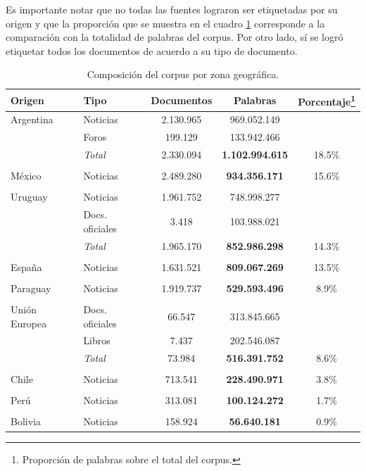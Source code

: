 Es importante notar que no todas las fuentes lograron ser etiquetadas por su origen y que la
proporción que se muestra en el cuadro \ref{table:corpus_country} corresponde a la comparación
con la totalidad de palabras del corpus. Por otro lado, sí se logró etiquetar todos los documentos
de acuerdo a su tipo de documento.

\begin{table}[h]
    \centering
    \begin{tabular}{llccc}
        \hline
        Origen & Tipo & Documentos & Palabras & Porcentaje\footnote{Proporción de palabras sobre el total del corpus.}\\
        \hline
        Argentina
         & Noticias & 2.130.965 & 969.052.149\\
         & Foros & 199.129 & 133.942.466\\
         & \textit{Total} & 2.330.094 & \textbf{1.102.994.615} & 18.5\%\\
        \\
        México
         & Noticias & 2.489.280 & \textbf{934.356.171} & 15.6\%\\
        \\
        Uruguay
         & Noticias & 1.961.752 & 748.998.277\\
         & Docs. oficiales & 3.418 & 103.988.021\\
         & \textit{Total} & 1.965.170 & \textbf{852.986.298} & 14.3\%\\
        \\
        España
         & Noticias & 1.631.521 & \textbf{809.067.269} & 13.5\%\\
        \\
        Paraguay
         & Noticias & 1.919.737 & \textbf{529.593.496} & 8.9\%\\
        \\
        Unión Europea
         & Docs. oficiales & 66.547 & 313.845.665\\
         & Libros & 7.437 & 202.546.087\\
         & \textit{Total} & 73.984 & \textbf{516.391.752} & 8.6\%\\
        \\
        Chile
         & Noticias & 713.541 & \textbf{228.490.971} & 3.8\%\\
        \\
        Perú
         & Noticias & 313.081 & \textbf{100.124.272} & 1.7\%\\
        \\
        Bolivia
         & Noticias & 158.924 & \textbf{56.640.181} & 0.9\%\\
        \hline
    \end{tabular}
    \caption{Composición del corpus por zona geográfica.}
    \label{table:corpus_country}
\end{table}

